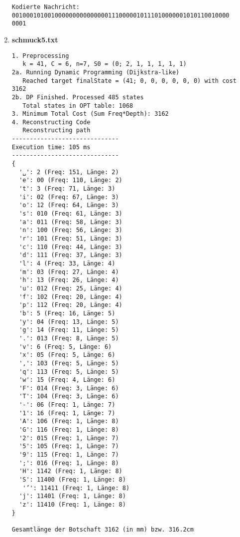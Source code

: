 \documentclass[a4paper,10pt,ngerman]{scrartcl}
\begin{document}
\begin{enumerate}
\begin{verbatim}
Kodierte Nachricht: 0010001010010000000000000001110000010111010000001010110010000
0001
  \end{verbatim}
  \item \textbf{schmuck5.txt}
  \begin{verbatim}
1. Preprocessing
   k = 41, C = 6, n=7, S0 = (0; 2, 1, 1, 1, 1, 1)
2a. Running Dynamic Programming (Dijkstra-like)
   Reached target finalState = (41; 0, 0, 0, 0, 0, 0) with cost 3162
2b. DP Finished. Processed 485 states
   Total states in OPT table: 1068
3. Minimum Total Cost (Sum Freq*Depth): 3162
4. Reconstructing Code
   Reconstructing path
------------------------------
Execution time: 105 ms
------------------------------
{
  '␣': 2 (Freq: 151, Länge: 2)
  'e': 00 (Freq: 110, Länge: 2)
  't': 3 (Freq: 71, Länge: 3)
  'i': 02 (Freq: 67, Länge: 3)
  'o': 12 (Freq: 64, Länge: 3)
  's': 010 (Freq: 61, Länge: 3)
  'a': 011 (Freq: 58, Länge: 3)
  'n': 100 (Freq: 56, Länge: 3)
  'r': 101 (Freq: 51, Länge: 3)
  'c': 110 (Freq: 44, Länge: 3)
  'd': 111 (Freq: 37, Länge: 3)
  'l': 4 (Freq: 33, Länge: 4)
  'm': 03 (Freq: 27, Länge: 4)
  'h': 13 (Freq: 26, Länge: 4)
  'u': 012 (Freq: 25, Länge: 4)
  'f': 102 (Freq: 20, Länge: 4)
  'p': 112 (Freq: 20, Länge: 4)
  'b': 5 (Freq: 16, Länge: 5)
  'y': 04 (Freq: 13, Länge: 5)
  'g': 14 (Freq: 11, Länge: 5)
  '.': 013 (Freq: 8, Länge: 5)
  'v': 6 (Freq: 5, Länge: 6)
  'x': 05 (Freq: 5, Länge: 6)
  ',': 103 (Freq: 5, Länge: 5)
  'q': 113 (Freq: 5, Länge: 5)
  'w': 15 (Freq: 4, Länge: 6)
  'F': 014 (Freq: 3, Länge: 6)
  'T': 104 (Freq: 3, Länge: 6)
  '-': 06 (Freq: 1, Länge: 7)
  '1': 16 (Freq: 1, Länge: 7)
  'A': 106 (Freq: 1, Länge: 8)
  'G': 116 (Freq: 1, Länge: 8)
  '2': 015 (Freq: 1, Länge: 7)
  '5': 105 (Freq: 1, Länge: 7)
  '9': 115 (Freq: 1, Länge: 7)
  ';': 016 (Freq: 1, Länge: 8)
  'H': 1142 (Freq: 1, Länge: 8)
  'S': 11400 (Freq: 1, Länge: 8)
   '’': 11411 (Freq: 1, Länge: 8)
  'j': 11401 (Freq: 1, Länge: 8)
  'z': 11410 (Freq: 1, Länge: 8)
}

Gesamtlänge der Botschaft 3162 (in mm) bzw. 316.2cm


\end{verbatim}
\end{enumerate}
\end{document}
